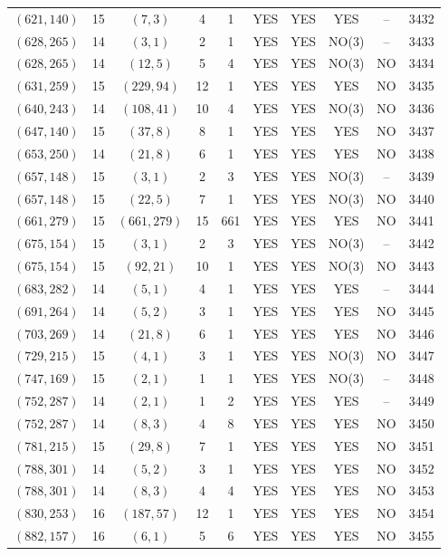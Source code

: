\begin{longtable}{|c|c|c|c|c|c|c|c|c|c|}
$(621, 140)$ & 15 & $(7, 3)$ & 4 & 1 & YES & YES & YES & -- & 3432\\
$(628, 265)$ & 14 & $(3, 1)$ & 2 & 1 & YES & YES & NO(3) & -- & 3433\\
$(628, 265)$ & 14 & $(12, 5)$ & 5 & 4 & YES & YES & NO(3) & NO & 3434\\
$(631, 259)$ & 15 & $(229, 94)$ & 12 & 1 & YES & YES & YES & NO & 3435\\
$(640, 243)$ & 14 & $(108, 41)$ & 10 & 4 & YES & YES & NO(3) & NO & 3436\\
$(647, 140)$ & 15 & $(37, 8)$ & 8 & 1 & YES & YES & YES & NO & 3437\\
$(653, 250)$ & 14 & $(21, 8)$ & 6 & 1 & YES & YES & YES & NO & 3438\\
$(657, 148)$ & 15 & $(3, 1)$ & 2 & 3 & YES & YES & NO(3) & -- & 3439\\
$(657, 148)$ & 15 & $(22, 5)$ & 7 & 1 & YES & YES & NO(3) & NO & 3440\\
$(661, 279)$ & 15 & $(661, 279)$ & 15 & 661 & YES & YES & YES & NO & 3441\\
$(675, 154)$ & 15 & $(3, 1)$ & 2 & 3 & YES & YES & NO(3) & -- & 3442\\
$(675, 154)$ & 15 & $(92, 21)$ & 10 & 1 & YES & YES & NO(3) & NO & 3443\\
$(683, 282)$ & 14 & $(5, 1)$ & 4 & 1 & YES & YES & YES & -- & 3444\\
$(691, 264)$ & 14 & $(5, 2)$ & 3 & 1 & YES & YES & YES & NO & 3445\\
$(703, 269)$ & 14 & $(21, 8)$ & 6 & 1 & YES & YES & YES & NO & 3446\\
$(729, 215)$ & 15 & $(4, 1)$ & 3 & 1 & YES & YES & NO(3) & NO & 3447\\
$(747, 169)$ & 15 & $(2, 1)$ & 1 & 1 & YES & YES & NO(3) & -- & 3448\\
$(752, 287)$ & 14 & $(2, 1)$ & 1 & 2 & YES & YES & YES & -- & 3449\\
$(752, 287)$ & 14 & $(8, 3)$ & 4 & 8 & YES & YES & YES & NO & 3450\\
$(781, 215)$ & 15 & $(29, 8)$ & 7 & 1 & YES & YES & YES & NO & 3451\\
$(788, 301)$ & 14 & $(5, 2)$ & 3 & 1 & YES & YES & YES & NO & 3452\\
$(788, 301)$ & 14 & $(8, 3)$ & 4 & 4 & YES & YES & YES & NO & 3453\\
$(830, 253)$ & 16 & $(187, 57)$ & 12 & 1 & YES & YES & YES & NO & 3454\\
$(882, 157)$ & 16 & $(6, 1)$ & 5 & 6 & YES & YES & YES & NO & 3455\\

\end{longtable}
